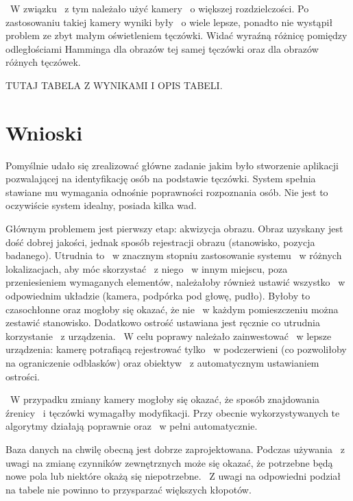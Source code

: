 ~W związku ~z tym należało użyć kamery ~o większej rozdzielczości. Po zastosowaniu takiej kamery wyniki były ~o wiele lepsze, ponadto nie wystąpił problem ze zbyt małym oświetleniem tęczówki. Widać wyraźną różnicę pomiędzy odległościami Hamminga dla obrazów tej samej tęczówki oraz dla obrazów różnych tęczówek.

TUTAJ TABELA Z WYNIKAMI I OPIS TABELI.

\section{Wnioski}
\label{sec:wnioski}

Pomyślnie udało się zrealizować główne zadanie jakim było stworzenie aplikacji pozwalającej na identyfikację osób na podstawie tęczówki. System spełnia stawiane mu wymagania odnośnie poprawności rozpoznania osób. Nie jest to oczywiście system idealny, posiada kilka wad.

Głównym problemem jest pierwszy etap: akwizycja obrazu. Obraz uzyskany jest dość dobrej jakości, jednak sposób rejestracji obrazu (stanowisko, pozycja badanego). Utrudnia to ~w znacznym stopniu zastosowanie systemu ~w różnych lokalizacjach, aby móc skorzystać ~z niego ~w innym miejscu, poza przeniesieniem wymaganych elementów, należałoby również ustawić wszystko ~w odpowiednim układzie (kamera, podpórka pod głowę, pudło). Byłoby to czasochłonne oraz mogłoby się okazać, że nie ~w każdym pomieszczeniu można zestawić stanowisko. Dodatkowo ostrość ustawiana jest ręcznie co utrudnia korzystanie ~z urządzenia. ~W celu poprawy należało zainwestować ~w lepsze urządzenia: kamerę potrafiącą rejestrować tylko ~w podczerwieni (co pozwoliłoby na ograniczenie odblasków) oraz obiektyw ~z automatycznym ustawianiem ostrości.

~W przypadku zmiany kamery mogłoby się okazać, że sposób znajdowania źrenicy ~i tęczówki wymagałby modyfikacji. Przy obecnie wykorzystywanych te algorytmy działają poprawnie oraz ~w pełni automatycznie.

Baza danych na chwilę obecną jest dobrze zaprojektowana. Podczas używania ~z uwagi na zmianę czynników zewnętrznych może się okazać, że potrzebne będą nowe pola lub niektóre okażą się niepotrzebne. ~Z uwagi na odpowiedni podział na tabele nie powinno to przysparzać większych kłopotów.




